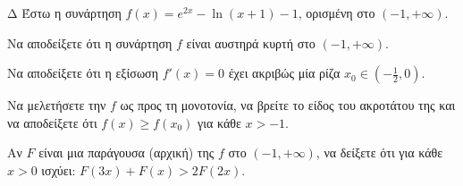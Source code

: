 \begin{thema}{Δ}
Έστω η συνάρτηση $f(x) = e^{2x} - \ln(x+1) - 1$, ορισμένη στο $(-1, +\infty)$.
\begin{erwthma}
    \item Να αποδείξετε ότι η συνάρτηση $f$ είναι αυστηρά κυρτή στο $(-1, +\infty)$.
    \item Να αποδείξετε ότι η εξίσωση $f'(x) = 0$ έχει ακριβώς μία ρίζα $x_0 \in \left(-\frac{1}{2}, 0\right)$.
    \item Να μελετήσετε την $f$ ως προς τη μονοτονία, να βρείτε το είδος του ακροτάτου της και να αποδείξετε ότι $f(x) \ge f(x_0)$ για κάθε $x > -1$.
    \item Αν $F$ είναι μια παράγουσα (αρχική) της $f$ στο $(-1, +\infty)$, να δείξετε ότι για κάθε $x > 0$ ισχύει: $F(3x) + F(x) > 2F(2x)$.
\end{erwthma}
\end{thema}
